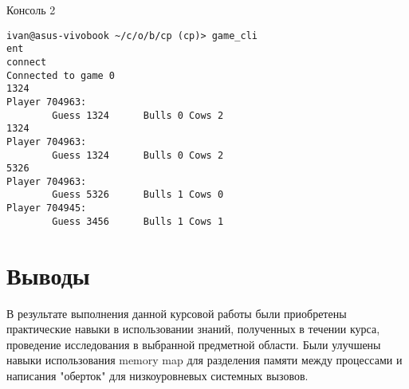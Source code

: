 \documentclass[a4paper, 12pt]{article}
\begin{document}
Консоль 2
\begin{verbatim}
ivan@asus-vivobook ~/c/o/b/cp (cp)> game_cli
ent
connect
Connected to game 0
1324
Player 704963:
        Guess 1324      Bulls 0 Cows 2
1324 
Player 704963:
        Guess 1324      Bulls 0 Cows 2
5326
Player 704963:
        Guess 5326      Bulls 1 Cows 0
Player 704945:
        Guess 3456      Bulls 1 Cows 1
\end{verbatim}

\newpage
\section{Выводы}
В результате выполнения данной курсовой работы были приобретены практические навыки в использовании знаний, полученных
в течении курса, проведение исследования в выбранной предметной области. Были улучшены навыки использования
memory map для разделения памяти между процессами и написания "оберток" для низкоуровневых системных вызовов.
\end{document}
